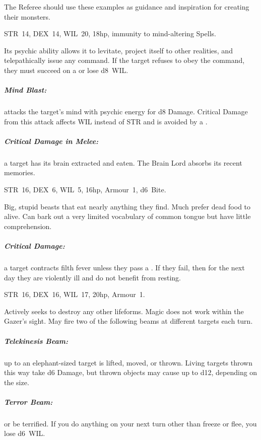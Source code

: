 \documentclass[itdr]{subfiles}
\begin{document}
\label{ch:appendix_b}

The Referee should use these examples as guidance and inspiration for creating their monsters.

\vfill

STR~14, DEX~14, WIL~20, 18hp, immunity to mind-altering Spells.

Its psychic ability allows it to levitate, project itself to other realities, and telepathically issue any command. If the target refuses to obey the command, they must succeed on a  or lose d8~WIL.

\subparagraph{Mind Blast:} attacks the target's mind with psychic energy for d8 Damage. Critical Damage from this attack affects WIL instead of STR and is avoided by a .

\subparagraph{Critical Damage in Melee:} a target has its brain extracted and eaten. The Brain Lord absorbs its recent memories.

\vfill


\vspace{-2ex}

STR~16, DEX~6, WIL~5, 16hp, Armour~1, d6~Bite.

Big, stupid beasts that eat nearly anything they find. Much prefer dead food to alive. Can bark out a very limited vocabulary of common tongue but have little comprehension.

\subparagraph{Critical Damage:} a target contracts filth fever unless they pass a . If they fail, then for the next day they are violently ill and do not benefit from resting.

\vfill

STR~16, DEX~16, WIL~17, 20hp, Armour~1.

Actively seeks to destroy any other lifeforms. Magic does not work within the Gazer's sight. May fire two of the following beams at different targets
each turn.

\subparagraph{Telekinesis Beam:} up to an elephant-sized target is lifted, moved, or thrown. Living targets thrown this way take d6 Damage, but thrown objects may cause up to d12, depending on the size.

\subparagraph{Terror Beam:}  or be terrified. If you do anything on your next turn other than freeze or flee, you lose d6~WIL.
\end{document}
